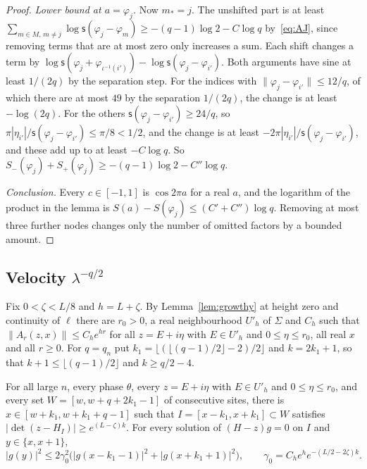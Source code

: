 \begin{proof}
\emph{Lower bound at $a=\varphi_j$.} Now $m_*=j$. The unshifted part is at least $\sum_{m\in M,\,m\ne j}\log\mathsf s(\varphi_j-\varphi_m)\ge-(q-1)\log2-C\log q$ by~\eqref{eq:AJ}, since removing terms that are at most zero only increases a sum. Each shift changes a term by $\log\mathsf s(\varphi_j+\varphi_{\iota^{-1}(i')})-\log\mathsf s(\varphi_j-\varphi_{i'})$. Both arguments have sine at least $1/(2q)$ by the separation step. For the indices with $\|\varphi_j-\varphi_{i'}\|\le12/q$, of which there are at most $49$ by the separation $1/(2q)$, the change is at least $-\log(2q)$. For the others $\mathsf s(\varphi_j-\varphi_{i'})\ge24/q$, so $\pi|\eta_{i'}|/\mathsf s(\varphi_j-\varphi_{i'})\le\pi/8<1/2$, and the change is at least $-2\pi|\eta_{i'}|/\mathsf s(\varphi_j-\varphi_{i'})$, and these add up to at least $-C\log q$. So $S_-(\varphi_j)+S_+(\varphi_j)\ge-(q-1)\log2-C''\log q$.

\emph{Conclusion.} Every $c\in[-1,1]$ is $\cos2\pi a$ for a real $a$, and the logarithm of the product in the lemma is $S(a)-S(\varphi_j)\le(C'+C'')\log q$. Removing at most three further nodes changes only the number of omitted factors by a bounded amount.
\end{proof}

\subsection{Velocity \texorpdfstring{$\lambda^{-q/2}$}{lambda to the -q/2}}

Fix $0<\zeta<L/8$ and $h=L+\zeta$. By Lemma~\ref{lem:growthy} at height zero and continuity of $\ell$ there are $r_0>0$, a real neighbourhood $U'_h$ of $\Sigma$ and $C_h$ such that $\|A_r(z,x)\|\le C_he^{hr}$ for all $z=E+i\eta$ with $E\in U'_h$ and $0\le\eta\le r_0$, all real $x$ and all $r\ge0$. For $q=q_n$ put $k_1=\lfloor(\lfloor(q-1)/2\rfloor-2)/2\rfloor$ and $k=2k_1+1$, so that $k+1\le\lfloor(q-1)/2\rfloor$ and $k\ge q/2-4$.

\begin{lemma}\label{lem:RNamo}
For all large $n$, every phase $\theta$, every $z=E+i\eta$ with $E\in U'_h$ and $0\le\eta\le r_0$, and every set $W=[w,w+q+2k_1-1]$ of consecutive sites, there is $x\in[w+k_1,w+k_1+q-1]$ such that $I=[x-k_1,x+k_1]\subset W$ satisfies $|\det(z-H_I)|\ge e^{(L-\zeta)k}$. For every solution of $(H-z)g=0$ on $I$ and $y\in\{x,x+1\}$,
\[
|g(y)|^2\le2\gamma_0^2\bigl(|g(x-k_1-1)|^2+|g(x+k_1+1)|^2\bigr),\qquad\gamma_0=C_he^he^{-(L/2-2\zeta)k}.
\]
\end{lemma}

